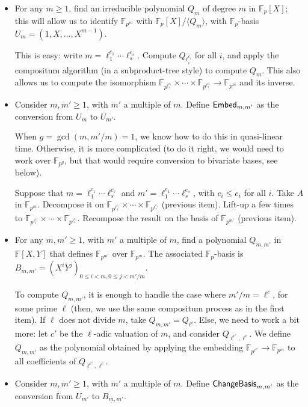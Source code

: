 \documentclass[12pt]{article}
\def\F {\ensuremath{\mathbb{F}}}
\begin{document}
\begin{itemize}
\item For any $m \ge 1$, find an irreducible polynomial $Q_m$ of
  degree $m$ in $\F_p[X]$; this will allow us to identify $\F_{p^m}$
  with $\F_p[X]/\langle Q_m \rangle$, with $\F_p$-basis
  $U_m=(1,X,\dots,X^{m-1})$. 

  This is easy: write $m = \ell_1^{c_1} \cdots \ell_s^{c_s}$. Compute
  $Q_{\ell_i^{c_i}}$ for all $i$, and apply the compositum algorithm
  (in a subproduct-tree style) to compute $Q_m$. This also allows us
  to compute the isomorphism $\F_{p^{\ell_1^{c_1}}} \times \cdots
  \times \F_{p^{\ell_s^{c_s}}} \to \F_{p^m}$ and its inverse.

\item Consider $m,m' \ge 1$, with $m'$ a multiple of $m$. Define ${\sf
  Embed}_{m,m'}$ as the conversion from $U_{m}$ to $U_{m'}$. 

  When $g=\gcd(m,m'/m)=1$, we know how to do this in quasi-linear
  time. Otherwise, it is more complicated (to do it right, we would
  need to work over $\F_{p^g}$, but that would require conversion to
  bivariate bases, see below).

  Suppose that $m = \ell_1^{c_1} \cdots \ell_s^{c_s}$ and $m' =
  \ell_1^{e_1} \cdots \ell_s^{e_s}$, with $c_i \le e_i$ for all $i$.
  Take $A$ in $\F_{p^m}$. Decompose it on $\F_{p^{\ell_1^{c_1}}}
  \times \cdots \times \F_{p^{\ell_s^{c_s}}}$ (previous item). Lift-up
  a few times to $\F_{p^{\ell_1^{e_1}}} \times \cdots \times
  \F_{p^{\ell_s^{e_s}}}$. Recompose the result on the basis of
  $\F_{p^{m'}}$ (previous item).

\item For any $m,m' \ge 1$, with $m'$ a multiple of $m$, find a
  polynomial $Q_{m,m'}$ in $\F[X,Y]$ that defines $\F_{p^{m'}}$ over
  $\F_{p^m}$. The associated $\F_p$-basis is $B_{m,m'}=(X^i Y^j)_{0
    \le i < m, 0 \le j < m'/m}$.

  To compute $Q_{m,m'}$, it is enough to handle the case where $m'/m =
  \ell^c$, for some prime $\ell$ (then, we use the same compositum
  process as in the first item). If $\ell$ does not divide $m$, take
  $Q_{m,m'}=Q_{\ell^c}$. Else, we need to work a bit more: let $c'$ be
  the $\ell$-adic valuation of $m$, and consider
  $Q_{\ell^{c'},\ell^c}$. We define $Q_{m,m'}$ as the polynomial
  obtained by applying the embedding $\F_{p^{\ell^{c'}}}\to\F_{p^m}$ to
  all coefficients of $Q_{\ell^{c'},\ell^c}$.
  
\item Consider $m,m' \ge 1$, with $m'$ a multiple of $m$. Define ${\sf
  ChangeBasis}_{m,m'}$ as the conversion from $U_{m'}$ to $B_{m,m'}$.
  

\end{itemize}
\end{document}
